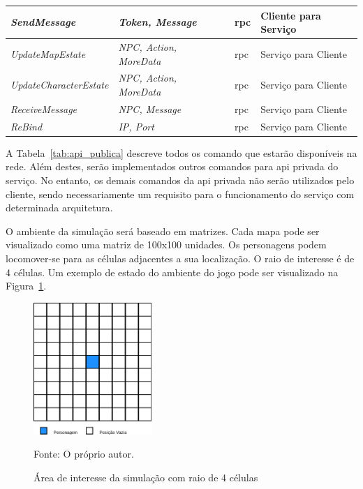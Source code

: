 \begin{table}[htb!]
\begin{adjustbox}{max width=\textwidth}
\begin{tabular}{|l|l|l|l|l|}
\textit{SendMessage}           & \textit{Token, Message}        &           & \ac{rpc}           & Cliente para Serviço \\ \hline
\textit{UpdateMapEstate}       & \textit{NPC, Action, MoreData} &           & \ac{rpc}           & Serviço para Cliente \\ \hline
\textit{UpdateCharacterEstate} & \textit{NPC, Action, MoreData} &           & \ac{rpc}           & Serviço para Cliente \\ \hline
\textit{ReceiveMessage}        & \textit{NPC, Message}          &           & \ac{rpc}           & Serviço para Cliente \\ \hline
\textit{ReBind}                & \textit{IP, Port}              &           & \ac{rpc}           & Serviço para Cliente \\ \hline
\end{tabular}
\end{adjustbox}
\end{table}

A Tabela~\ref{tab:api_publica} descreve todos os comando que estarão disponíveis na rede.
%
Além destes, serão implementados outros comandos para \ac{api} privada do serviço.
%
No entanto, os demais comandos da \ac{api} privada não serão utilizados pelo cliente, sendo necessariamente um requisito para o funcionamento do serviço com determinada arquitetura.


O ambiente da simulação será baseado em matrizes. Cada mapa pode ser visualizado como uma matriz de 100x100 unidades.
%
Os personagens podem locomover-se para as células adjacentes a sua localização.
%
O raio de interesse é de 4 células.
%
Um exemplo de estado do ambiente do jogo pode ser visualizado na Figura~\ref{fig:roi}.

\begin{figure}[htb!]
  \caption{Área de interesse da simulação com raio de 4 células}
  \label{fig:roi}
  \includegraphics[height=5.0cm]{img/cap3/roi.png}
  \centering

  Fonte: O próprio autor.
\end{figure}

